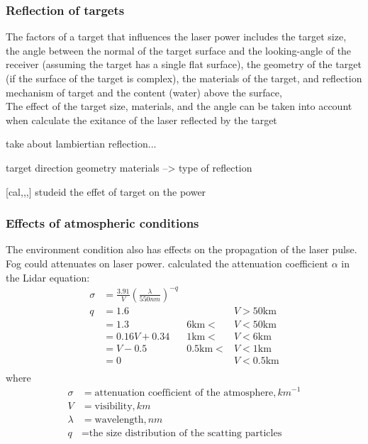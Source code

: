 \subsubsection{Reflection of targets}
The factors of a target that influences the laser power includes the target size, the angle between the normal of the target surface and the looking-angle of the receiver (assuming the target has a single flat surface), the geometry of the target (if the surface of the target is complex), the materials of the target, and reflection mechanism of target and the content (\eg water) above the surface, \etc\\
The effect of the target size, materials, and the angle can be taken into account when calculate the exitance of the laser reflected by the target

take about lambiertian reflection... 

target direction
geometry
materials --> type of reflection


[cal,,,] studeid the effet of target on the power




\subsubsection{Effects of atmospheric conditions}
The environment condition also has effects on the propagation of the laser pulse. Fog could attenuates on laser power. \cite{kim2001comparison} calculated the attenuation coefficient $\alpha$ in the Lidar equation:
\begin{align*}
\sigma&=\frac{3.91}{V}(\frac{\lambda}{550 \mathit{nm}})^{-q}\\
q&=1.6	&	&V>50 \textrm{km}\\
&=1.3	 &	6 \textrm{km}<&V<50 \textrm{km}\\
&=0.16V + 0.34	&	1 \textrm{km}<&V<6 \textrm{km}\\
&=V-0.5	&	0.5 \textrm{km}<&V<1 \textrm{km}\\
&=0	&	&V<0.5 \textrm{km}\\
\end{align*}
where\begin{align*}
\sigma &=\textrm{attenuation coefficient of the atmosphere}, km^{-1}\\
V&=\textrm{visibility}, km\\
\lambda&=\textrm{wavelength}, nm\\
q&=\textrm{the size distribution of the scatting particles}
\end{align*}

